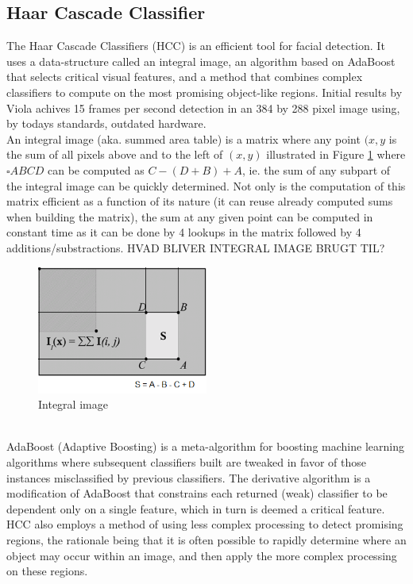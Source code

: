 \subsection{Haar Cascade Classifier}\label{sec:hcc}
%
The Haar Cascade Classifiers (HCC)\cite{viola01,lienhart01,schmidt01,schmidt02} is an efficient tool for facial detection. It uses a data-structure called an integral image, an algorithm based on AdaBoost that selects critical visual features, and a method that combines complex classifiers to compute on the most promising object-like regions. Initial results by Viola\cite{viola01} achives 15 frames per second detection in an 384 by 288 pixel image using, by todays standards, outdated hardware.\\
%
An integral image (aka. summed area table) is a matrix where any point $(x,y$ is the sum of all pixels above and to the left of $(x,y)$ illustrated in Figure \ref{fig:integral_img} where $\square ABCD$ can be computed as $C-(D+B)+A$, ie. the sum of any subpart of the integral image can be quickly determined. Not only is the computation of this matrix efficient as a function of its nature (it can reuse already computed sums when building the matrix), the sum at any given point can be computed in constant time as it can be done by 4 lookups in the matrix followed by 4 additions/substractions.
HVAD BLIVER INTEGRAL IMAGE BRUGT TIL?
%
\begin{figure}[!ht]
     \centering
     \includegraphics[width=0.50\textwidth]{img/integral_image.png}
     \caption{Integral image}\label{fig:integral_img}
\end{figure}\\
%
AdaBoost (Adaptive Boosting) is a meta-algorithm for boosting machine learning algorithms where subsequent classifiers built are tweaked in favor of those instances misclassified by previous classifiers. The derivative algorithm is a modification of AdaBoost that constrains each returned (weak) classifier to be dependent only on a single feature, which in turn is deemed a critical feature.\\
HCC also employs a method of using less complex processing to detect promising regions, the rationale being that it is often possible to rapidly determine where an object may occur within an image, and then apply the more complex processing on these regions.
%
